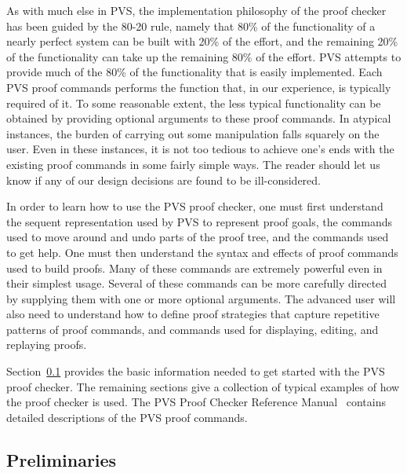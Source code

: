 As with much else in PVS, the implementation philosophy of the proof
checker has been guided by the 80-20 rule, namely that 80\% of the
functionality of a nearly perfect system can be built with 20\% of the
effort, and the remaining 20\% of the functionality can take up the
remaining 80\% of the effort.  PVS attempts to provide much of the 80\%
of the functionality that is easily implemented.  Each PVS proof
commands performs the function that, in our experience, is typically
required of it.  To some reasonable extent, the less typical
functionality can be obtained by providing optional arguments to these
proof commands.  In atypical instances, the burden of carrying out some
manipulation falls squarely on the user.  Even in these instances, it is
not too tedious to achieve one's ends with the existing proof commands
in some fairly simple ways.  The reader should let us know if any of our
design decisions are found to be ill-considered.

In order to learn how to use the PVS proof checker, one must first
understand the sequent representation used by PVS to represent proof
goals, the commands used to move around and undo parts of the proof
tree, and the commands used to get help.  One must then understand the
syntax and effects of proof commands used to build proofs.  Many of these
commands are extremely powerful even in their simplest usage.  Several
of these commands can be more carefully directed by supplying them with
one or more optional arguments.  The advanced user will also need to
understand how to define proof strategies that capture repetitive
patterns of proof commands, and commands used for displaying, editing,
and replaying proofs.

Section~\ref{prelims} provides the basic information needed to get
started with the PVS proof checker.  The remaining sections give a
collection of typical examples of how the proof checker is used.
The PVS Proof Checker Reference
Manual~\cite{PVS:prover} contains detailed descriptions of the PVS
proof commands.

\subsection{Preliminaries}\label{prelims}

